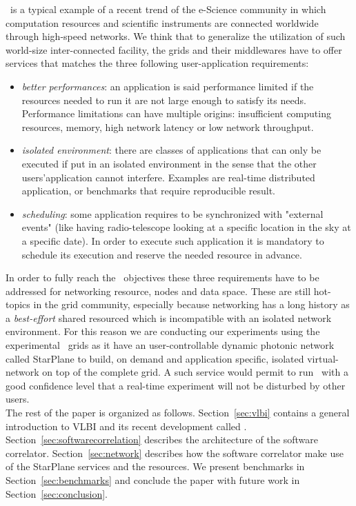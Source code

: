 \scarie\ is a typical example of a recent trend of the e-Science 
community in which computation resources and scientific instruments 
are connected worldwide through high-speed networks. We think that to 
generalize the utilization of such world-size inter-connected facility, 
the grids and their middlewares have to offer services that matches the three
following user-application requirements:
\begin{itemize}
\item \emph{better performances}: an application is said performance
  limited if the resources needed to run it are not large enough to
  satisfy its needs. Performance limitations can have multiple
  origins: insufficient computing resources, memory, high network
  latency or low network throughput.
  
\item \emph{isolated environment}: there are classes of applications
  that can only be executed if put in an isolated environment in the 
  sense that the other users'application cannot interfere. Examples are 
  real-time distributed application, or benchmarks that require reproducible
  result. 

\item \emph{scheduling}: some application requires to be synchronized
  with "external events" (like having radio-telescope looking at a
  specific location in the sky at a specific date). In order to
  execute such application it is mandatory to schedule its execution 
  and reserve the needed resource in advance.
\end{itemize}
In order to fully reach the \scarie\ objectives these three
requirements have to be addressed for networking resource, nodes and
data space. These are still hot-topics in the grid community,
especially because networking has a long history as a
\emph{best-effort} shared resourced which is incompatible with an
isolated network environment. For this reason we are conducting our
experiments using the experimental \ grids as it have an
user-controllable dynamic photonic network called StarPlane to build,
on demand and application specific, isolated virtual-network on top of
the complete grid. A such service would permit to run \scarie\ with a
good confidence level that a real-time
experiment will not be disturbed by other users. \\

The rest of the paper is organized as follows. Section~\ref{sec:vlbi}
contains a general introduction to VLBI and its recent development 
called \evlbi. Section~\ref{sec:softwarecorrelation} describes the 
architecture of the software correlator. Section~\ref{sec:network} 
describes how the software correlator make use of the StarPlane services 
and the  resources. We present benchmarks in Section~\ref{sec:benchmarks} 
and conclude the paper with future work in Section~\ref{sec:conclusion}.




